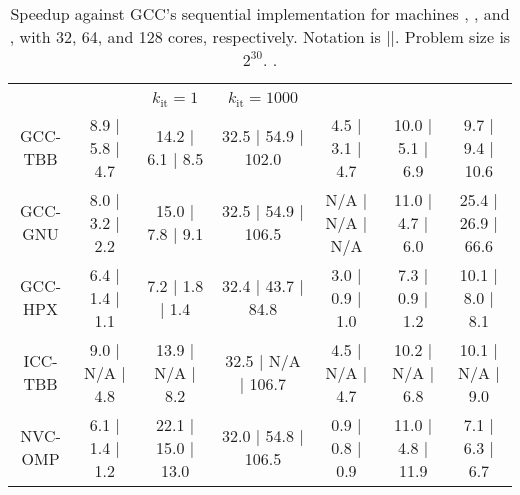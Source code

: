 \begin{table*}[t]
	\caption{Speedup against GCC's sequential implementation for machines \machhydralong, \machnebulalong, and \machvsclong, with \num{32}, \num{64}, and \num{128} cores, respectively. Notation is \machhydra|\machnebula|\machvsc. Problem size is $2^{30}$. \higherisbetter.}
	\label{tab:speedup-vs-seq}
	\begin{tabular}{ccccccc}
		\toprule
		        & \groupfind      & \groupforeach        & \groupforeach          & \groupinclscan  & \groupreduce      & \groupsort         \\
		        &                 & $k_\mathrm{it} = 1 $ & $k_\mathrm{it} = 1000$ &                 &                   &                    \\
		\midrule
		GCC-TBB & 8.9 | 5.8 | 4.7 & 14.2 | 6.1 | 8.5     & 32.5 | 54.9 | 102.0    & 4.5 | 3.1 | 4.7 & 10.0 | 5.1 | 6.9  & 9.7 | 9.4 | 10.6   \\
		GCC-GNU & 8.0 | 3.2 | 2.2 & 15.0 | 7.8 | 9.1     & 32.5 | 54.9 | 106.5    & N/A | N/A | N/A & 11.0 | 4.7 | 6.0  & 25.4 | 26.9 | 66.6 \\
		GCC-HPX & 6.4 | 1.4 | 1.1 & 7.2 | 1.8 | 1.4      & 32.4 | 43.7 | 84.8     & 3.0 | 0.9 | 1.0 & 7.3 | 0.9 | 1.2   & 10.1 | 8.0 | 8.1   \\
		ICC-TBB & 9.0 | N/A | 4.8 & 13.9 | N/A | 8.2     & 32.5 | N/A | 106.7     & 4.5 | N/A | 4.7 & 10.2 | N/A | 6.8  & 10.1 | N/A | 9.0   \\
		NVC-OMP & 6.1 | 1.4 | 1.2 & 22.1 | 15.0 | 13.0   & 32.0 | 54.8 | 106.5    & 0.9 | 0.8 | 0.9 & 11.0 | 4.8 | 11.9 & 7.1 | 6.3 | 6.7    \\
		\bottomrule
	\end{tabular}
\end{table*}